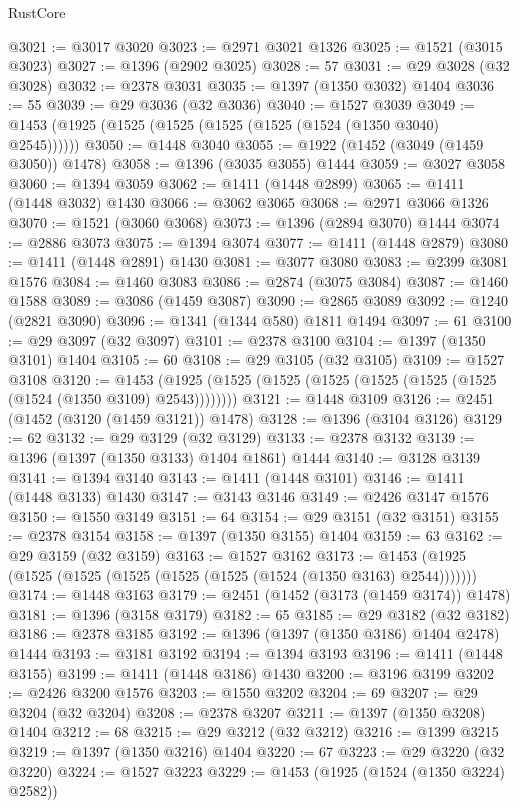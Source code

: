 \begin{lexlean}{RustCore}
\begin{coremodule}
@3021 := @3017 @3020
@3023 := @2971 @3021 @1326
@3025 := @1521 (@3015 @3023)
@3027 := @1396 (@2902 @3025)
@3028 := 57
@3031 := @29 @3028 (@32 @3028)
@3032 := @2378 @3031
@3035 := @1397 (@1350 @3032) @1404
@3036 := 55
@3039 := @29 @3036 (@32 @3036)
@3040 := @1527 @3039
@3049 := @1453 (@1925 (@1525 (@1525 (@1525 (@1525 (@1524 (@1350 @3040) @2545))))))
@3050 := @1448 @3040
@3055 := @1922 (@1452 (@3049 (@1459 @3050)) @1478)
@3058 := @1396 (@3035 @3055) @1444
@3059 := @3027 @3058
@3060 := @1394 @3059
@3062 := @1411 (@1448 @2899)
@3065 := @1411 (@1448 @3032) @1430
@3066 := @3062 @3065
@3068 := @2971 @3066 @1326
@3070 := @1521 (@3060 @3068)
@3073 := @1396 (@2894 @3070) @1444
@3074 := @2886 @3073
@3075 := @1394 @3074
@3077 := @1411 (@1448 @2879)
@3080 := @1411 (@1448 @2891) @1430
@3081 := @3077 @3080
@3083 := @2399 @3081 @1576
@3084 := @1460 @3083
@3086 := @2874 (@3075 @3084)
@3087 := @1460 @1588
@3089 := @3086 (@1459 @3087)
@3090 := @2865 @3089
@3092 := @1240 (@2821 @3090)
@3096 := @1341 (@1344 @580) @1811 @1494
@3097 := 61
@3100 := @29 @3097 (@32 @3097)
@3101 := @2378 @3100
@3104 := @1397 (@1350 @3101) @1404
@3105 := 60
@3108 := @29 @3105 (@32 @3105)
@3109 := @1527 @3108
@3120 := @1453 (@1925 (@1525 (@1525 (@1525 (@1525 (@1525 (@1525 (@1524 (@1350 @3109) @2543))))))))
@3121 := @1448 @3109
@3126 := @2451 (@1452 (@3120 (@1459 @3121)) @1478)
@3128 := @1396 (@3104 @3126)
@3129 := 62
@3132 := @29 @3129 (@32 @3129)
@3133 := @2378 @3132
@3139 := @1396 (@1397 (@1350 @3133) @1404 @1861) @1444
@3140 := @3128 @3139
@3141 := @1394 @3140
@3143 := @1411 (@1448 @3101)
@3146 := @1411 (@1448 @3133) @1430
@3147 := @3143 @3146
@3149 := @2426 @3147 @1576
@3150 := @1550 @3149
@3151 := 64
@3154 := @29 @3151 (@32 @3151)
@3155 := @2378 @3154
@3158 := @1397 (@1350 @3155) @1404
@3159 := 63
@3162 := @29 @3159 (@32 @3159)
@3163 := @1527 @3162
@3173 := @1453 (@1925 (@1525 (@1525 (@1525 (@1525 (@1525 (@1524 (@1350 @3163) @2544)))))))
@3174 := @1448 @3163
@3179 := @2451 (@1452 (@3173 (@1459 @3174)) @1478)
@3181 := @1396 (@3158 @3179)
@3182 := 65
@3185 := @29 @3182 (@32 @3182)
@3186 := @2378 @3185
@3192 := @1396 (@1397 (@1350 @3186) @1404 @2478) @1444
@3193 := @3181 @3192
@3194 := @1394 @3193
@3196 := @1411 (@1448 @3155)
@3199 := @1411 (@1448 @3186) @1430
@3200 := @3196 @3199
@3202 := @2426 @3200 @1576
@3203 := @1550 @3202
@3204 := 69
@3207 := @29 @3204 (@32 @3204)
@3208 := @2378 @3207
@3211 := @1397 (@1350 @3208) @1404
@3212 := 68
@3215 := @29 @3212 (@32 @3212)
@3216 := @1399 @3215
@3219 := @1397 (@1350 @3216) @1404
@3220 := 67
@3223 := @29 @3220 (@32 @3220)
@3224 := @1527 @3223
@3229 := @1453 (@1925 (@1524 (@1350 @3224) @2582))

\end{coremodule}
\end{lexlean}
